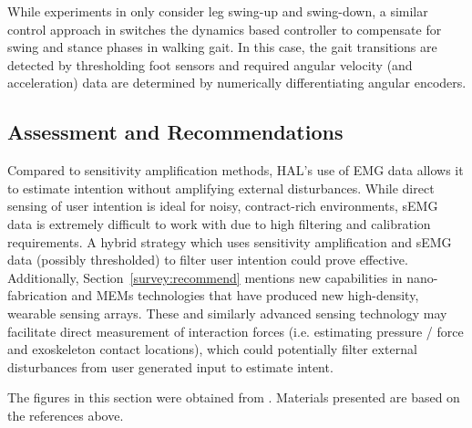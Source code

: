 \begin{refsection}
While experiments in \cite{HALmuscleImped2005} only consider leg swing-up and swing-down, a similar control approach in \cite{HALvTorqueImp2002} switches the dynamics based controller to compensate for swing and stance phases in walking gait.  In this case, the gait transitions are detected by thresholding foot sensors and required angular velocity (and acceleration) data are determined by numerically differentiating angular encoders.


\subsection{Assessment and Recommendations}

Compared to sensitivity amplification methods, HAL's use of EMG data allows it to estimate intention without amplifying external disturbances.  While direct sensing of user intention is ideal for noisy, contract-rich environments, sEMG data is extremely difficult to work with due to high filtering and calibration requirements.  A hybrid strategy which uses sensitivity amplification and sEMG data (possibly thresholded) to filter user intention could prove effective.  Additionally, Section~\ref{survey:recommend} mentions new capabilities in nano-fabrication and MEMs technologies that have produced new high-density, wearable sensing arrays. These and similarly advanced sensing technology may facilitate direct measurement of interaction forces (i.e. estimating pressure / force and exoskeleton contact locations), which could potentially filter external disturbances from user generated input to estimate intent.

\nocite{*}
\printbibliography[heading=subbibliography]

The figures in this section were obtained from \cite{HALmuscleImped2005,HALassist2011}.  Materials presented are based on the references above.

\end{refsection}





